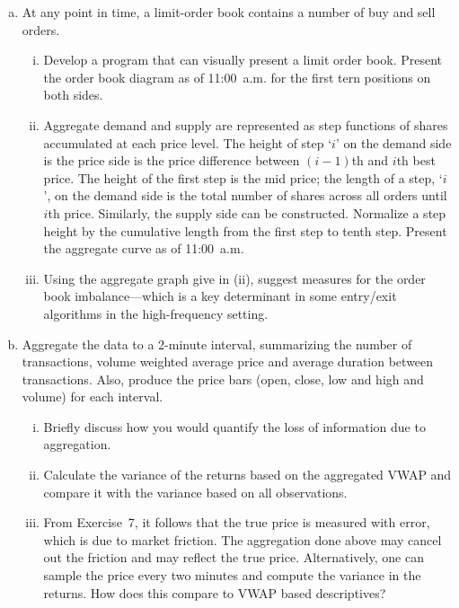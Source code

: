 \begin{enumerate}[(a)]
\item At any point in time, a limit-order book contains a number of buy and sell orders.
	\begin{enumerate}[(i)]
	\item Develop a program that can visually present a limit order book. Present the order book diagram as of 11:00~a.m. for the first tern positions on both sides.
	\item Aggregate demand and supply are represented as step functions of shares accumulated at each price level. The height of step `$i$' on the demand side is the price side is the price difference between $(i-1)$th and $i$th best price. The height of the first step is the mid price; the length of a step, `$i$', on the demand side is the total number of shares across all orders until $i$th price. Similarly, the supply side can be constructed. Normalize a step height by the cumulative length from the first step to tenth step. Present the aggregate curve as of 11:00~a.m.
	\item Using the aggregate graph give in (ii), suggest measures for the order book imbalance---which is a key determinant in some entry/exit algorithms in the high-frequency setting.
	\end{enumerate}

\item Aggregate the data to a 2-minute interval, summarizing the number of transactions, volume weighted average price and average duration between transactions. Also, produce the price bars (open, close, low and high and volume) for each interval.
	\begin{enumerate}[(i)]
	\item Briefly discuss how you would quantify the loss of information due to aggregation.
	\item Calculate the variance of the returns based on the aggregated VWAP and compare it with the variance based on all observations.
	\item From Exercise~7, it follows that the true price is measured with error, which is due to market friction. The aggregation done above may cancel out the friction and may reflect the true price. Alternatively, one can sample the price every two minutes and compute the variance in the returns. How does this compare to VWAP based descriptives?
	\end{enumerate}
\end{enumerate}
